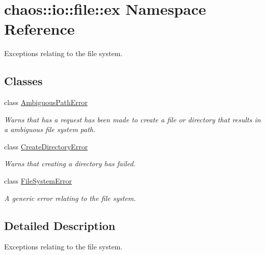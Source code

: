 \hypertarget{namespacechaos_1_1io_1_1file_1_1ex}{}\section{chaos\+:\+:io\+:\+:file\+:\+:ex Namespace Reference}
\label{namespacechaos_1_1io_1_1file_1_1ex}


Exceptions relating to the file system.  


\subsection*{Classes}
\begin{DoxyCompactItemize}
\item 
class \hyperlink{classchaos_1_1io_1_1file_1_1ex_1_1_ambiguous_path_error}{Ambiguous\+Path\+Error}
\begin{DoxyCompactList}\small\item\em Warns that has a request has been made to create a file or directory that results in a ambiguous file system path. \end{DoxyCompactList}\item 
class \hyperlink{classchaos_1_1io_1_1file_1_1ex_1_1_create_directory_error}{Create\+Directory\+Error}
\begin{DoxyCompactList}\small\item\em Warns that creating a directory has failed. \end{DoxyCompactList}\item 
class \hyperlink{classchaos_1_1io_1_1file_1_1ex_1_1_file_system_error}{File\+System\+Error}
\begin{DoxyCompactList}\small\item\em A generic error relating to the file system. \end{DoxyCompactList}\end{DoxyCompactItemize}


\subsection{Detailed Description}
Exceptions relating to the file system. 